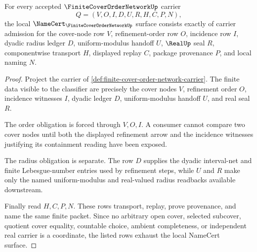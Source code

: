 \begin{theorem}
\label{thm:finite-cover-order-network-namecert-obligations}
For every accepted $\FiniteCoverOrderNetworkUp$ carrier
$$
Q=(V,O,I,D,U,R,H,C,P,N),
$$
the local $\NameCert_{\FiniteCoverOrderNetworkUp}$ surface consists exactly of carrier admission for the cover-node row $V$, refinement-order row $O$, incidence row $I$, dyadic radius ledger $D$, uniform-modulus handoff $U$, $\RealUp$ seal $R$, componentwise transport $H$, displayed replay $C$, package provenance $P$, and local naming $N$.
\end{theorem}
\begin{proof}
Project the carrier of \autoref{def:finite-cover-order-network-carrier}. The finite data visible to the classifier are precisely the cover nodes $V$, refinement order $O$, incidence witnesses $I$, dyadic ledger $D$, uniform-modulus handoff $U$, and real seal $R$.

The order obligation is forced through $V,O,I$. A consumer cannot compare two cover nodes until both the displayed refinement arrow and the incidence witnesses justifying its containment reading have been exposed.

The radius obligation is separate. The row $D$ supplies the dyadic interval-net and finite Lebesgue-number entries used by refinement steps, while $U$ and $R$ make only the named uniform-modulus and real-valued radius readbacks available downstream.

Finally read $H,C,P,N$. These rows transport, replay, prove provenance, and name the same finite packet. Since no arbitrary open cover, selected subcover, quotient cover equality, countable choice, ambient completeness, or independent real carrier is a coordinate, the listed rows exhaust the local NameCert surface.
\end{proof}

